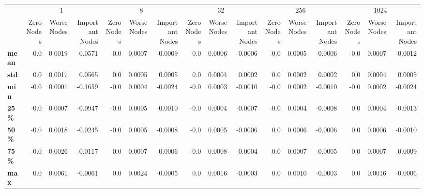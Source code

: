 \begin{tabular}{lrrrrrrrrrrrrrrr}
\toprule
{} & \multicolumn{3}{c}{1} & \multicolumn{3}{c}{8} & \multicolumn{3}{c}{32} & \multicolumn{3}{c}{256} & \multicolumn{3}{c}{1024} \\
{} & Zero Nodes & Worse Nodes & Important Nodes & Zero Nodes & Worse Nodes & Important Nodes & Zero Nodes & Worse Nodes & Important Nodes & Zero Nodes & Worse Nodes & Important Nodes & Zero Nodes & Worse Nodes & Important Nodes \\
\midrule
\textbf{mean} &       -0.0 &      0.0019 &         -0.0571 &       -0.0 &      0.0007 &         -0.0009 &       -0.0 &      0.0006 &         -0.0006 &       -0.0 &      0.0005 &         -0.0006 &       -0.0 &      0.0007 &         -0.0012 \\
\textbf{std } &        0.0 &      0.0017 &          0.0565 &        0.0 &      0.0005 &          0.0005 &        0.0 &      0.0004 &          0.0002 &        0.0 &      0.0002 &          0.0002 &        0.0 &      0.0004 &          0.0005 \\
\textbf{min } &       -0.0 &      0.0001 &         -0.1659 &       -0.0 &      0.0004 &         -0.0024 &       -0.0 &      0.0003 &         -0.0010 &       -0.0 &      0.0002 &         -0.0010 &       -0.0 &      0.0002 &         -0.0024 \\
\textbf{25\% } &       -0.0 &      0.0007 &         -0.0947 &       -0.0 &      0.0005 &         -0.0010 &       -0.0 &      0.0004 &         -0.0007 &       -0.0 &      0.0004 &         -0.0008 &        0.0 &      0.0004 &         -0.0013 \\
\textbf{50\% } &       -0.0 &      0.0018 &         -0.0245 &       -0.0 &      0.0005 &         -0.0008 &       -0.0 &      0.0005 &         -0.0006 &        0.0 &      0.0006 &         -0.0006 &        0.0 &      0.0006 &         -0.0010 \\
\textbf{75\% } &       -0.0 &      0.0026 &         -0.0117 &        0.0 &      0.0007 &         -0.0006 &       -0.0 &      0.0008 &         -0.0004 &        0.0 &      0.0007 &         -0.0005 &        0.0 &      0.0007 &         -0.0009 \\
\textbf{max } &        0.0 &      0.0061 &         -0.0061 &        0.0 &      0.0024 &         -0.0005 &        0.0 &      0.0016 &         -0.0003 &        0.0 &      0.0010 &         -0.0003 &        0.0 &      0.0016 &         -0.0006 \\
\bottomrule
\end{tabular}

